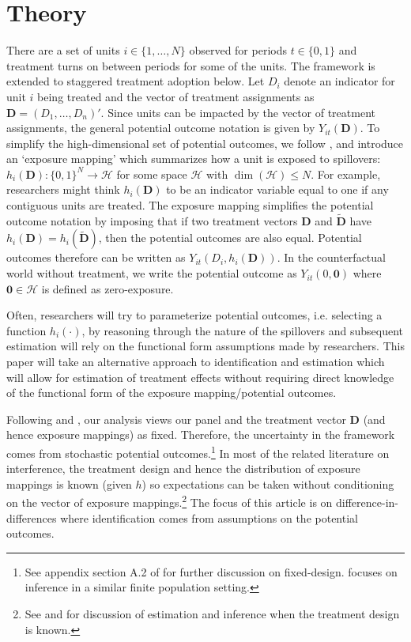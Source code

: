 \section{Theory}

There are a set of units $i \in \{1, \dots, N\}$ observed for periods $t \in \{0,1\}$ and treatment turns on between periods for some of the units. The framework is extended to staggered treatment adoption below. Let $D_i$ denote an indicator for unit $i$ being treated and the vector of treatment assignments as $\bm{D} = (D_1, \dots, D_n)'$. Since units can be impacted by the vector of treatment assignments, the general potential outcome notation is given by $Y_{it}(\bm{D})$. To simplify the high-dimensional set of potential outcomes, we follow \citet{aronow2017estimating,vazquez2023identification}, and introduce an `exposure mapping' which summarizes how a unit is exposed to spillovers: $h_i(\bm{D}): \{0, 1\}^N \to \mathcal{H}$ for some space $\mathcal{H}$ with $\dim(\mathcal{H}) \leq N$. For example, researchers might think $h_i(\bm{D})$ to be an indicator variable equal to one if any contiguous units are treated. The exposure mapping simplifies the potential outcome notation by imposing that if two treatment vectors $\bm{D}$ and $\tilde{\bm{D}}$ have $h_i(\bm{D}) = h_i(\tilde{\bm{D}})$, then the potential outcomes are also equal. Potential outcomes therefore can be written as $Y_{it}(D_i, h_i(\bm{D}))$. In the counterfactual world without treatment, we write the potential outcome as $Y_{it}(0, \bm{0})$ where $\bm{0} \in \mathcal{H}$ is defined as zero-exposure.

Often, researchers will try to parameterize potential outcomes, i.e. selecting a function $h_i(\cdot)$, by reasoning through the nature of the spillovers and subsequent estimation will rely on the functional form assumptions made by researchers. This paper will take an alternative approach to identification and estimation which will allow for estimation of treatment effects without requiring direct knowledge of the functional form of the exposure mapping/potential outcomes. 

Following \citet{Borusyak_Jaravel_Spiess_2021} and \citet{de2024difference}, our analysis views our panel and the treatment vector $\bm{D}$ (and hence exposure mappings) as fixed. Therefore, the uncertainty in the framework comes from stochastic potential outcomes.\footnote{See appendix section A.2 of \citet{Borusyak_Jaravel_Spiess_2021} for further discussion on fixed-design. \citet{xu2023difference} focuses on inference in a similar finite population setting.} In most of the related literature on interference, the treatment design and hence the distribution of exposure mappings is known (given $h$) so expectations can be taken without conditioning on the vector of exposure mappings.\footnote{See \citet{savje2021average} and \citet{pollmann2020causal} for discussion of estimation and inference when the treatment design is known.} The focus of this article is on difference-in-differences where identification comes from assumptions on the potential outcomes.

